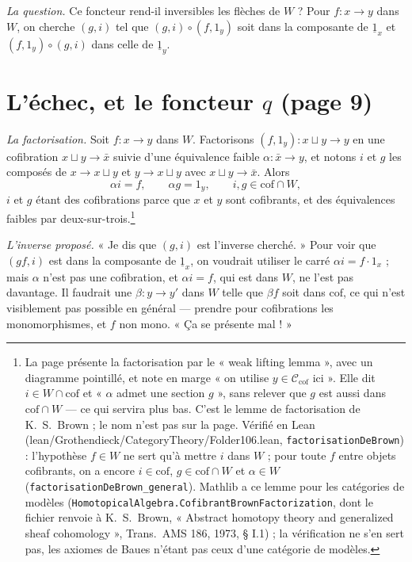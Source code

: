 \documentclass[11pt,a4paper]{article}
\begin{document}
\emph{La question.} Ce foncteur rend-il inversibles les flèches de $W$ ? Pour
$f : x \to y$ dans $W$, on cherche $(g, i)$ tel que $(g,i) \circ (f, 1_{y})$
soit dans la composante de $\underline{1}_{x}$ et $(f, 1_{y}) \circ (g,i)$ dans
celle de $\underline{1}_{y}$.

\section*{L'échec, et le foncteur $q$ (page 9)}

\emph{La factorisation.} Soit $f : x \to y$ dans $W$. Factorisons
$(f, 1_{y}) : x \sqcup y \to y$ en une cofibration $x \sqcup y \to \bar{x}$
suivie d'une équivalence faible $\alpha : \bar{x} \to y$, et notons $i$ et $g$
les composés de $x \to x \sqcup y$ et $y \to x \sqcup y$ avec
$x \sqcup y \to \bar{x}$. Alors
\[
\alpha i = f, \qquad \alpha g = 1_{y}, \qquad i, g \in \mathrm{cof} \cap W,
\]
$i$ et $g$ étant des cofibrations parce que $x$ et $y$ sont cofibrants, et des
équivalences faibles par deux-sur-trois.\footnote{La page présente la
factorisation par le « weak lifting lemma », avec un diagramme pointillé, et
note en marge « on utilise $y \in \mathcal{C}_{\mathrm{cof}}$ ici ». Elle dit
$i \in W \cap \mathrm{cof}$ et « $\alpha$ admet une section $g$ », sans
relever que $g$ est aussi dans $\mathrm{cof} \cap W$ --- ce qui servira plus
bas. C'est le lemme de factorisation de K.~S.~Brown ; le nom n'est pas sur la
page. Vérifié en Lean (lean/Grothendieck/CategoryTheory/Folder106.lean,
\texttt{factorisationDeBrown}) : l'hypothèse $f \in W$ ne sert qu'à mettre $i$
dans $W$ ; pour toute $f$ entre objets cofibrants, on a encore
$i \in \mathrm{cof}$, $g \in \mathrm{cof} \cap W$ et $\alpha \in W$
(\texttt{factorisationDeBrown\_general}). Mathlib a ce lemme pour les
catégories de modèles (\texttt{HomotopicalAlgebra.CofibrantBrownFactorization},
dont le fichier renvoie à K.~S.~Brown, « Abstract homotopy theory and
generalized sheaf cohomology », Trans.\ AMS 186, 1973, § I.1) ; la
vérification ne s'en sert pas, les axiomes de Baues n'étant pas ceux d'une
catégorie de modèles.}

\emph{L'inverse proposé.} « Je dis que $(g, i)$ est l'inverse cherché. » Pour
voir que $(gf, i)$ est dans la composante de $\underline{1}_{x}$, on voudrait
utiliser le carré $\alpha i = f \cdot 1_{x}$ ; mais $\alpha$ n'est pas une
cofibration, et $\alpha i = f$, qui est dans $W$, ne l'est pas davantage.
Il faudrait une $\beta : y \to y'$ dans $W$ telle que $\beta f$ soit dans
$\mathrm{cof}$, ce qui n'est visiblement pas possible en général --- prendre
pour cofibrations les monomorphismes, et $f$ non mono. « Ça se présente
mal ! »
\end{document}
